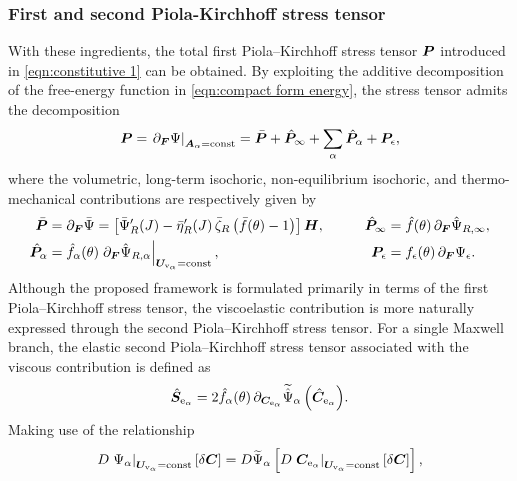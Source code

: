 \subsubsection{First and second Piola-Kirchhoff stress tensor}
\label{sec:visco_first_second_Piola}


With these ingredients, the total first Piola--Kirchhoff stress tensor $\P$ introduced in \eqref{eqn:constitutive 1} can be obtained. By exploiting the additive decomposition of the free-energy function in \eqref{eqn:compact form energy}, the stress tensor admits the decomposition
%
\begin{equation}
	\label{eqn:visco_first_piola}
	\P
	=
	\left.{\partial_{\F}}\Psi\right|_{\vect{A}_{\alpha}=\text{const}}
	=
	\bar\P + \hat\P_\infty + \sum_{\alpha}\hat\P_\alpha + \P_\epsilon ,
\end{equation}
%
where the volumetric, long-term isochoric, non-equilibrium isochoric, and thermo-mechanical contributions are respectively given by
%
\begin{equation}
	\begin{aligned}
		\bar\P
		&=
		{\partial_{\F}}\bar\Psi
		=
		\left[
		\bar\Psi_R^{\prime}(J)
		-
		\bar\eta_R^{\prime}(J)\,\bar\zeta_R
		\left(\bar f(\theta)-1\right)
		\right]\vect{H},
		&\qquad
		\hat\P_\infty
		&=
		\hat{f}(\theta)\,
		{\partial_{\F}}\hat\Psi_{R,\infty},
		\\
		\hat\P_\alpha
		&=
		\hat{f}_{\alpha}(\theta)
		\left.
		{\partial_{\F}}\hat\Psi_{R,\alpha}
		\right|_{\vect{U}_{\mathrm{v}_{\alpha}}=\text{const}},
		&\qquad
		\P_\epsilon
		&=
		{f}_{\epsilon}(\theta)\,
		{\partial_{\F}}\Psi_\epsilon .
	\end{aligned}
\end{equation}
%
Although the proposed framework is formulated primarily in terms of the first Piola--Kirchhoff stress tensor, the viscoelastic contribution is more naturally expressed through the second Piola--Kirchhoff stress tensor. For a single Maxwell branch, the elastic second Piola--Kirchhoff stress tensor associated with the viscous contribution is defined as
%
\begin{equation}
	\label{eqn:maxw_Sea}
	\hat{\boldsymbol{S}}_{\mathrm{e}_\alpha}
	=
	2 \hat{f}_{\alpha}(\theta)\,
	{\partial_{\C_{\mathrm{e}_\alpha}}
		\widetilde{\hat{\Psi}}_{\alpha}
		\left(\hat{\C}_{\mathrm{e}_\alpha}\right)} .
\end{equation}
%
Making use of the relationship
%
\begin{equation}
	\label{eqn:Sea_Sa}
	D\left.\Psi_{\alpha}\right|_{\boldsymbol{U}_{\mathrm{v}_{\alpha}}=\textrm{const}}[\delta \C]
	=
	D \widetilde{\Psi}_{\alpha}
	\left[
	D\left.\C_{\textrm{e}_{\alpha}}\right|_{\boldsymbol{U}_{\textrm{v}_{\alpha}}=\textrm{const}}
	[\delta \C]
	\right],
\end{equation}
